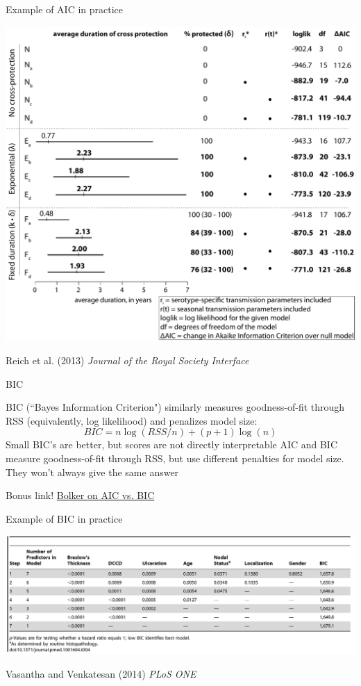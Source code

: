 \begin{frame}{Example of AIC in practice}

\includegraphics[width=.8\linewidth]{8-2_model_select/figures/AICExample.pdf}

\tiny Reich et al. (2013) {\em Journal of the Royal Society Interface}

\end{frame}



\begin{frame}{BIC}

BIC (``Bayes Information Criterion") similarly measures goodness-of-fit through RSS (equivalently, log likelihood) and penalizes model size:
$$ BIC = n \log(RSS/n) + (p+1) \log(n) $$
\bi
        \myitem Small BIC's are better, but scores are not directly interpretable
	\myitem AIC and BIC measure goodness-of-fit through RSS, but use different penalties for model size. They won't always give the same answer
\ei


Bonus link! \href{http://emdbolker.wikidot.com/blog:aic-vs-bic}{Bolker on AIC vs. BIC}

\end{frame}


\begin{frame}{Example of BIC in practice}

\includegraphics[width=\linewidth]{8-2_model_select/figures/modelSelectionExample.png}

\tiny  Vasantha and Venkatesan (2014) {\em PLoS ONE}

\end{frame}



